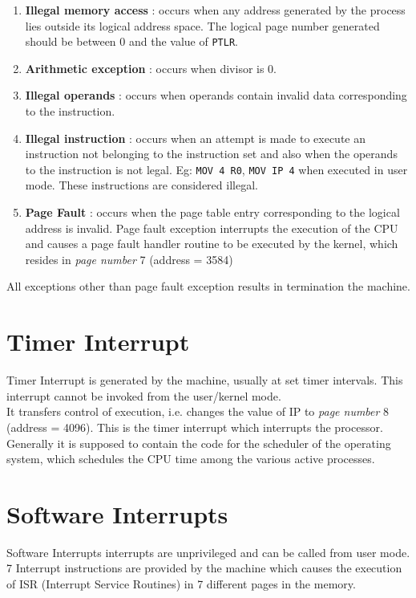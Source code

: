 \documentclass[11pt]{report}
\begin{document}
\begin{enumerate}
\item \textbf{Illegal memory access} : occurs when any address generated by the process lies outside its logical address space. The logical page number generated should be between 0 and the value of \texttt{PTLR}.

\item \textbf{Arithmetic exception} : occurs when divisor is 0.
\item \textbf{Illegal operands} : occurs when operands contain invalid data corresponding to the instruction. 
\item \textbf{Illegal instruction} : occurs when an attempt is made to execute an instruction not belonging to the instruction set and also when the operands to the instruction is not legal. Eg: \texttt{MOV 4 R0}, \texttt{MOV IP 4} when executed in user mode. These instructions are considered illegal.
\item \textbf{Page Fault} : occurs when the page table entry corresponding to the logical address is invalid. Page fault exception interrupts the execution of the CPU and causes a page fault handler routine to be executed by the kernel, which resides in  \textit{page number} 7 (address = 3584)


\end{enumerate}
All exceptions other than page fault exception results in termination the machine. 

\section{Timer Interrupt }
Timer Interrupt is generated by the machine, usually at set timer intervals. This interrupt cannot be invoked from the user/kernel mode.\\

It transfers control of execution, i.e. changes the value of IP to \textit{page number} 8 (address = 4096). This is the timer interrupt which interrupts the processor. Generally it is supposed to contain the code for the scheduler of the operating system, which schedules the CPU time among the various active processes.

\section{Software Interrupts }
Software Interrupts interrupts are unprivileged and can be called from user mode. 7 Interrupt instructions are provided by the machine which causes the execution of ISR (Interrupt Service Routines) in 7 different pages in the memory. 
\end{document}
